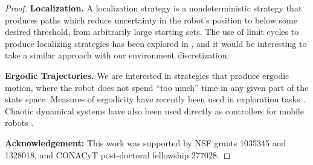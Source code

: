 \documentclass[]{styles/svproc}  %
\begin{document}
\begin{proof}
\textbf{Localization.} A localization strategy is a nondeterministic strategy that 
produces paths which reduce uncertainty in the robot's position to below some
desired threshold, from arbitrarily large starting sets. The use of limit cycles
to produce localizing strategies has been explored in \cite{alam2018space}, and
it would be interesting to take a similar approach with our environment
discretization.

\textbf{Ergodic Trajectories.} 
We are interested in strategies that produce ergodic motion, where the robot
does not spend ``too much'' time in any given part of the state space. Measures
of ergodicity have recently been used in exploration tasks
\cite{miller2016ergodic}. Chaotic dynamical systems have also been used directly
as controllers for mobile robots \cite{nakamura2001chaotic}.


\textbf{Acknowledgement:} This work was supported by NSF grants 1035345 and 1328018, and CONACyT
post-doctoral fellowship 277028.

\vspace{-1em}





%



\end{proof}
\end{document}

